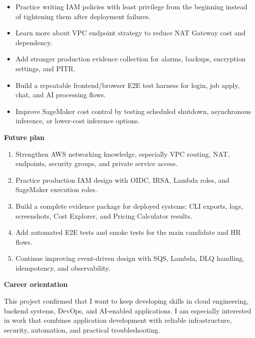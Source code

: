 \begin{itemize}
\tightlist
\item
  Practice writing IAM policies with least privilege from the beginning
  instead of tightening them after deployment failures.
\item
  Learn more about VPC endpoint strategy to reduce NAT Gateway cost and
  dependency.
\item
  Add stronger production evidence collection for alarms, backups,
  encryption settings, and PITR.
\item
  Build a repeatable frontend/browser E2E test harness for login, job
  apply, chat, and AI processing flows.
\item
  Improve SageMaker cost control by testing scheduled shutdown,
  asynchronous inference, or lower-cost inference options.
\end{itemize}

\vspace{0.5em}\noindent\textbf{Future plan}\par

\begin{enumerate}
\def\labelenumi{\arabic{enumi}.}
\tightlist
\item
  Strengthen AWS networking knowledge, especially VPC routing, NAT,
  endpoints, security groups, and private service access.
\item
  Practice production IAM design with OIDC, IRSA, Lambda roles, and
  SageMaker execution roles.
\item
  Build a complete evidence package for deployed systems: CLI exports,
  logs, screenshots, Cost Explorer, and Pricing Calculator results.
\item
  Add automated E2E tests and smoke tests for the main candidate and HR
  flows.
\item
  Continue improving event-driven design with SQS, Lambda, DLQ handling,
  idempotency, and observability.
\end{enumerate}

\vspace{0.5em}\noindent\textbf{Career orientation}\par

This project confirmed that I want to keep developing skills in cloud
engineering, backend systems, DevOps, and AI-enabled applications. I am
especially interested in work that combines application development with
reliable infrastructure, security, automation, and practical
troubleshooting.
